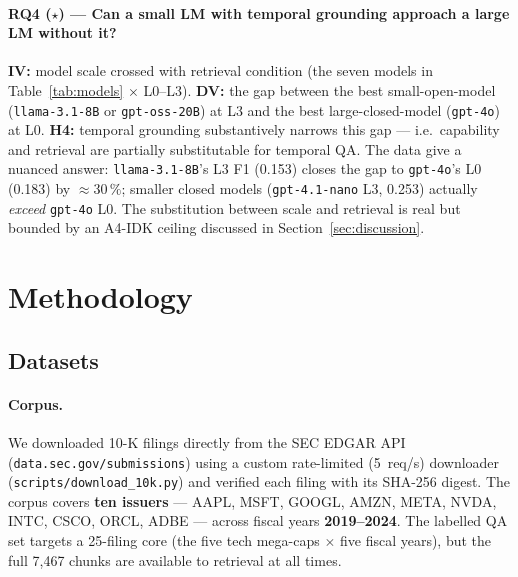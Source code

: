 \documentclass[11pt]{article}
\begin{document}
\paragraph{RQ4 ($\star$) --- Can a small LM with temporal grounding
approach a large LM without it?}
\textbf{IV:} model scale crossed with retrieval condition (the seven
models in Table~\ref{tab:models} $\times$ L0--L3). \textbf{DV:} the
gap between the best small-open-model (\texttt{llama-3.1-8B} or
\texttt{gpt-oss-20B}) at L3 and the best large-closed-model
(\texttt{gpt-4o}) at L0. \textbf{H4:} temporal grounding substantively
narrows this gap --- i.e.\ capability and retrieval are partially
substitutable for temporal QA. The data give a nuanced answer:
\texttt{llama-3.1-8B}'s L3 F1 (0.153) closes the gap to
\texttt{gpt-4o}'s L0 (0.183) by $\approx 30\,\%$; smaller closed models
(\texttt{gpt-4.1-nano} L3, 0.253) actually \emph{exceed}
\texttt{gpt-4o} L0. The substitution between scale and retrieval is
real but bounded by an A4-IDK ceiling discussed in
Section~\ref{sec:discussion}.

\section{Methodology}
\label{sec:method}

\subsection{Datasets}
\label{sec:corpus}
\paragraph{Corpus.}
We downloaded 10-K filings directly from the SEC EDGAR API
(\texttt{data.sec.gov/submissions}) using a custom rate-limited
(5~req/s) downloader (\texttt{scripts/download\_10k.py}) and verified
each filing with its SHA-256 digest. The corpus covers
\textbf{ten issuers} --- AAPL, MSFT, GOOGL, AMZN, META, NVDA, INTC,
CSCO, ORCL, ADBE --- across fiscal years \textbf{2019--2024}. The
labelled QA set targets a 25-filing core (the five tech mega-caps
$\times$ five fiscal years), but the full 7{,}467 chunks are available
to retrieval at all times.
\end{document}
